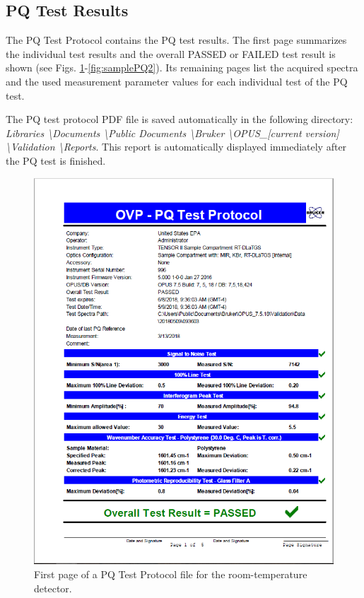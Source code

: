 \subsection{PQ Test Results}
The PQ Test Protocol contains the PQ test results. The first page summarizes the individual test results and the overall PASSED or FAILED test result is shown (see Figs. \ref{fig:samplePQ}-\ref{fig:samplePQ2}). Its remaining pages list the acquired spectra and the used measurement parameter values for each individual test of the PQ test.

The PQ test protocol PDF file is saved automatically in the following directory: \emph{Libraries \textbackslash Documents \textbackslash Public Documents \textbackslash Bruker \textbackslash OPUS\_[current version] \textbackslash Validation \textbackslash Reports}. This report is automatically displayed immediately after the PQ test is finished.

\begin{figure}[htp]
    \centering
    \includegraphics[width=6.5in]{PQtest.PNG}
    \caption{First page of a PQ Test Protocol file for the room-temperature detector.}
    \label{fig:samplePQ}
\end{figure}

